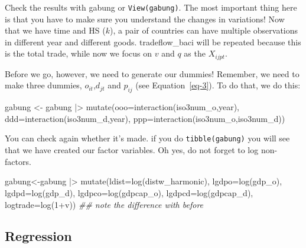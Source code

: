 \documentclass[
  a4paper,
  DIV=11,
  numbers=noendperiod]{scrreprt}
\newenvironment{Shaded}{\begin{snugshade}}{\end{snugshade}}
\newcommand{\AttributeTok}[1]{\textcolor[rgb]{0.40,0.45,0.13}{#1}}
\newcommand{\DecValTok}[1]{\textcolor[rgb]{0.68,0.00,0.00}{#1}}
\newcommand{\DocumentationTok}[1]{\textcolor[rgb]{0.37,0.37,0.37}{\textit{#1}}}
\newcommand{\FunctionTok}[1]{\textcolor[rgb]{0.28,0.35,0.67}{#1}}
\newcommand{\NormalTok}[1]{\textcolor[rgb]{0.00,0.23,0.31}{#1}}
\newcommand{\OtherTok}[1]{\textcolor[rgb]{0.00,0.23,0.31}{#1}}
\newcommand{\SpecialCharTok}[1]{\textcolor[rgb]{0.37,0.37,0.37}{#1}}
\begin{document}
Check the results with gabung or \texttt{View(gabung)}. The most
important thing here is that you have to make sure you understand the
changes in variations! Now that we have time and HS (\(k\)), a pair of
countries can have multiple observations in different year and different
goods. tradeflow\_baci will be repeated because this is the total trade,
while now we focus on \(v\) and \(q\) as the \(X_{ijpt}\).

Before we go, however, we need to generate our dummies! Remember, we
need to make three dummies, \(o_{it}\),\(d_{jt}\) and \(p_{ij}\) (see
Equation~\ref{eq-3}). To do that, we do this:

\begin{Shaded}
\begin{Highlighting}[numbers=left,,]
\NormalTok{gabung }\OtherTok{\textless{}{-}}\NormalTok{ gabung }\SpecialCharTok{|\textgreater{}}
  \FunctionTok{mutate}\NormalTok{(}\AttributeTok{ooo=}\FunctionTok{interaction}\NormalTok{(iso3num\_o,year),}
         \AttributeTok{ddd=}\FunctionTok{interaction}\NormalTok{(iso3num\_d,year),}
         \AttributeTok{ppp=}\FunctionTok{interaction}\NormalTok{(iso3num\_o,iso3num\_d))}
\end{Highlighting}
\end{Shaded}

You can check again whether it's made. if you do \texttt{tibble(gabung)}
you will see that we have created our factor variables. Oh yes, do not
forget to log non-factors.

\begin{Shaded}
\begin{Highlighting}[numbers=left,,]
\NormalTok{gabung}\OtherTok{\textless{}{-}}\NormalTok{gabung }\SpecialCharTok{|\textgreater{}}
  \FunctionTok{mutate}\NormalTok{(}\AttributeTok{ldist=}\FunctionTok{log}\NormalTok{(distw\_harmonic),}
         \AttributeTok{lgdpo=}\FunctionTok{log}\NormalTok{(gdp\_o),}
         \AttributeTok{lgdpd=}\FunctionTok{log}\NormalTok{(gdp\_d),}
         \AttributeTok{lgdpco=}\FunctionTok{log}\NormalTok{(gdpcap\_o),}
         \AttributeTok{lgdpcd=}\FunctionTok{log}\NormalTok{(gdpcap\_d),}
         \AttributeTok{logtrade=}\FunctionTok{log}\NormalTok{(}\DecValTok{1}\SpecialCharTok{+}\NormalTok{v)) }\DocumentationTok{\#\# note the difference with before}
\end{Highlighting}
\end{Shaded}

\hypertarget{regression-1}{%
\subsection{Regression}\label{regression-1}}
\end{document}

